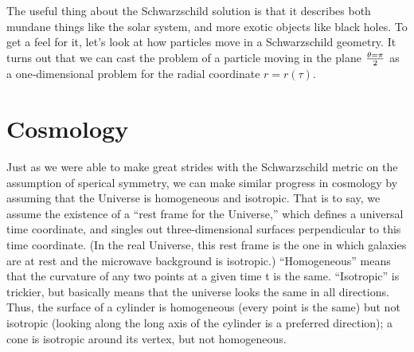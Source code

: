 \begin{remark}
The useful thing about the Schwarzschild solution is that it describes both mundane
things like the solar system, and more exotic objects like black holes. To get a feel for it,
let’s look at how particles move in a Schwarzschild geometry. It turns out that we can cast
the problem of a particle moving in the plane  $\theta=\pi\over 2$ as a one-dimensional problem for the radial coordinate $r=r(\tau)$.
\end{remark}

\section{Cosmology}
Just as we were able to make great strides with the Schwarzschild metric on the assumption
of sperical symmetry, we can make similar progress in cosmology by assuming that the
Universe is homogeneous and isotropic. That is to say, we assume the existence of a “rest
frame for the Universe,” which defines a universal time coordinate, and singles out three-dimensional surfaces perpendicular to this time coordinate. (In the real Universe, this rest
frame is the one in which galaxies are at rest and the microwave background is isotropic.)
“Homogeneous” means that the curvature of any two points at a given time t is the same.
“Isotropic” is trickier, but basically means that the universe looks the same in all directions.
Thus, the surface of a cylinder is homogeneous (every point is the same) but not isotropic
(looking along the long axis of the cylinder is a preferred direction); a cone is isotropic around
its vertex, but not homogeneous.


\printindex

